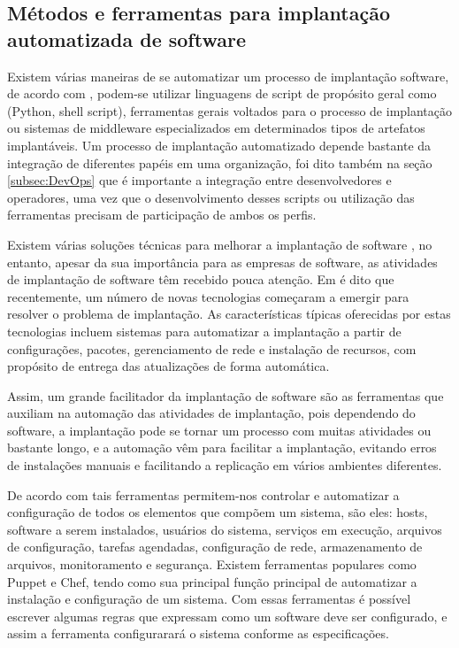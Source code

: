 \subsection{Métodos e ferramentas para implantação automatizada de software}
\label{subsec:metodoseferramentas}


Existem várias maneiras de se automatizar um processo de implantação software,
de acordo com \cite{leo2014}, podem-se utilizar linguagens de script de propósito
geral como (Python, shell script), ferramentas gerais voltados para o processo
de implantação ou sistemas de middleware especializados em determinados tipos de artefatos implantáveis.
Um processo de implantação automatizado depende bastante da integração de diferentes papéis
em uma organização, foi dito também na seção \ref{subsec:DevOps} que é importante a
integração entre desenvolvedores e operadores, uma vez que o desenvolvimento desses
scripts ou utilização das ferramentas precisam de participação de ambos os perfis.

Existem várias soluções técnicas  para melhorar a implantação de software \cite{5741269},
no entanto, apesar da sua importância para as empresas de software, as atividades
de implantação de software têm recebido pouca atenção. Em \cite{deployment1998}
é dito que recentemente, um número de novas tecnologias começaram a emergir para
resolver o problema de implantação. As características típicas oferecidas por
estas tecnologias incluem sistemas para automatizar a implantação a partir de
configurações, pacotes, gerenciamento de rede e instalação de recursos, com
propósito de entrega das atualizações de forma automática.

Assim, um grande facilitador da implantação de software são as ferramentas que auxiliam na
automação das atividades de implantação, pois dependendo do software, a implantação
pode se tornar um processo com muitas atividades ou bastante longo, e a automação
vêm para facilitar a implantação, evitando erros de instalações manuais e facilitando a replicação em
vários ambientes diferentes.

De acordo com \cite{6265084} tais ferramentas permitem-nos controlar e automatizar
a configuração de todos os elementos que compõem um sistema, são eles: hosts, software a serem instalados,
usuários do sistema, serviços em execução, arquivos de configuração, tarefas agendadas,
configuração de rede, armazenamento de arquivos, monitoramento e segurança. Existem
ferramentas populares como Puppet e Chef, tendo como sua principal função principal
de automatizar a instalação e configuração de um sistema. Com essas ferramentas é
possível escrever algumas regras que expressam como um software deve ser configurado,
e assim a ferramenta configurarará o sistema conforme as especificações.

